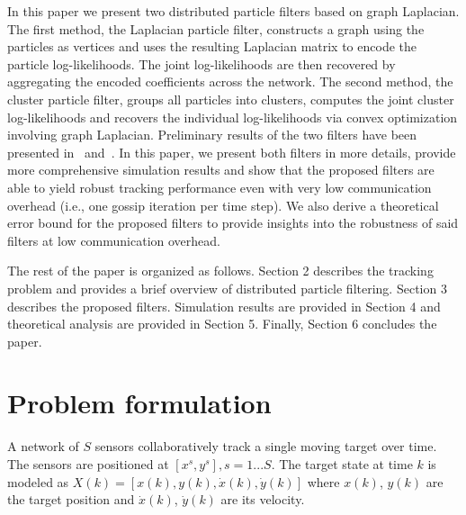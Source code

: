 \documentclass[10pt,letterpaper,final]{article}
\begin{document}

In this paper we present two distributed particle filters based on graph Laplacian. The first method, the Laplacian particle filter, constructs a graph using the particles as vertices and uses the resulting Laplacian matrix to encode the particle log-likelihoods. The joint log-likelihoods are then recovered by aggregating the encoded coefficients across the network. The second method, the cluster particle filter, groups all particles into clusters, computes the joint cluster log-likelihoods and recovers the individual log-likelihoods via convex optimization involving graph Laplacian. Preliminary results of the two filters have been presented in~\cite{Rabbat2016} and~\cite{Mohammadi2012}. In this paper, we present both filters in more details, provide more comprehensive simulation results and show that the proposed filters are able to yield robust tracking performance even with very low communication overhead (i.e., one gossip iteration per time step). We also derive a theoretical error bound for the proposed filters to provide insights into the robustness of said filters at low communication overhead. 

The rest of the paper is organized as follows. Section 2 describes the tracking problem and provides a brief overview of distributed particle filtering. Section 3 describes the proposed filters. Simulation results are provided in Section 4 and theoretical analysis are provided in Section 5. Finally, Section 6 concludes the paper. 

\section{Problem formulation}
A network of $S$ sensors collaboratively track a single moving target over time. The sensors are positioned at $[x^s, y^s], s=1...S$. The target state at time $k$ is modeled as $X(k) = [x(k),y(k), \dot{x}(k), \dot{y}(k)]$ where $x(k)$, $y(k)$ are the target position and $\dot{x}(k)$, $\dot{y}(k)$ are its velocity. 
\end{document}
